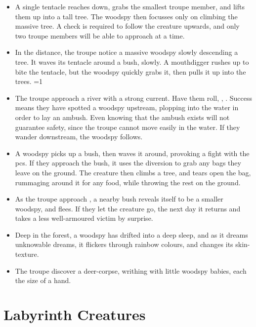 \begin{multicols}{2}
\begin{itemize}
  \item
  A single tentacle reaches down, grabs the smallest troupe member, and lifts them up into a tall tree.
  The woodspy then focusses only on climbing the massive tree.
  A  check is required to follow the creature upwards, and only two troupe members will be able to approach at a time.
  \item
  In the distance, the troupe notice a massive woodspy slowly descending a tree.
  It waves its tentacle around a bush, slowly.
  A mouthdigger rushes up to bite the tentacle, but the woodspy quickly grabs it, then pulls it up into the trees.
  \ifnum\value{temperature}=1
    \item
    The troupe approach a river with a strong current.
    Have them roll, , \tn[9].
    Success means they have spotted a woodspy upstream, plopping into the water in order to lay an ambush.
    Even knowing that the ambush exists will not guarantee safety, since the troupe cannot move easily in the water.
    If they wander downstream, the woodspy follows.
    \item
    A woodspy picks up a bush, then waves it around, provoking a fight with the \glspl{pc}.
    If they approach the bush, it uses the diversion to grab any bags they leave on the ground.
    The creature then climbs a tree, and tears open the bag, rummaging around it for any food, while throwing the rest on the ground.
  \else
    \item
    As the troupe approach , a nearby bush reveals itself to be a smaller woodspy, and flees.
    If they let the creature go, the next day it returns and takes a less well-armoured victim by surprise.
    \item
    Deep in the forest, a woodspy has drifted into a deep sleep, and as it dreams unknowable dreams, it flickers through rainbow colours, and changes its skin-texture.
    \item
    The troupe discover a deer-corpse, writhing with little woodspy babies, each the size of a hand.
  \fi
\end{itemize}

\end{multicols}

\section[Labyrinth Creatures]{Labyrinth Creatures \A}

